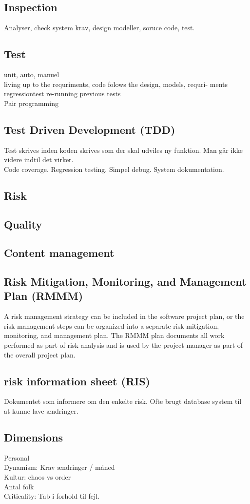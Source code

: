\documentclass[11pt,a4paper]{article}
\begin{document}
\subsection{Inspection}
Analyser, check system krav, design modeller, soruce code, test.
\subsection{Test}
unit, auto, manuel\\
living up to the requriments, code folows the design, models, requri-
ments\\
regressiontest re-running previous tests\\
Pair programming
\subsection{Test Driven Development (TDD)}
Test skrives inden koden skrives som der skal udviles ny funktion. Man går ikke videre indtil det virker.\\
Code coverage. Regression testing. Simpel debug. System dokumentation.
\subsection{Risk}
\subsection{Quality}
\subsection{Content management}
\subsection{Risk Mitigation, Monitoring, and Management Plan (RMMM)}
A risk management strategy can be included in the software project plan, or the risk management steps can be organized into a separate
risk mitigation, monitoring, and management plan. The RMMM plan documents all work performed as part of risk analysis and is used by the project manager as part of the overall project plan.
\subsection{risk information sheet (RIS)}
Dokumentet som informere om den enkelte risk. 
Ofte brugt database system til at kunne lave ændringer.
\subsection{Dimensions}
Personal\\
Dynamism: Krav ændringer / måned\\
Kultur: chaos vs order\\
Antal folk\\
Criticality: Tab i forhold til fejl.
\end{document}
